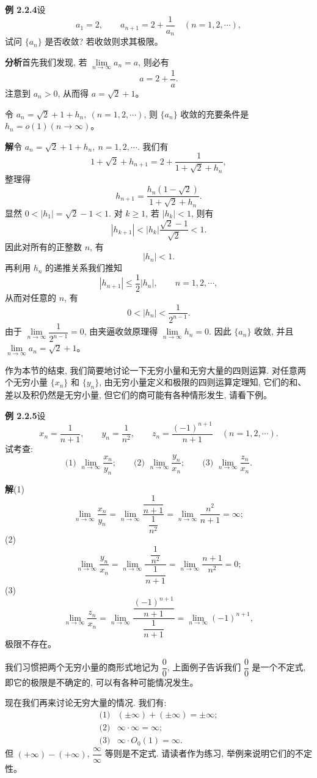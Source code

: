 \documentclass[UTF8, 12pt, fontset=fandol, oneside]{ctexart}
\begin{document}
\noindent\textbf{例 2.2.4}\quad 设
\[
  a_1=2,\qquad a_{n+1}=2+\frac1{a_n}\quad(n=1,2,\cdots),
\]
试问 $\{a_n\}$ 是否收敛? 若收敛则求其极限。

\noindent\textbf{分析}\quad 首先我们发现, 若 $\lim\limits_{n\to\infty}a_n=a$, 则必有
\[
  a=2+\frac1a.
\]
注意到 $a_n>0$, 从而得 $a=\sqrt2+1$。

令 $a_n=\sqrt2+1+h_n,\ (n=1,2,\cdots)$, 则 $\{a_n\}$ 收敛的充要条件是 $h_n=o(1)(n\to\infty)$。

\noindent\textbf{解}\quad 令 $a_n=\sqrt2+1+h_n,\ n=1,2,\cdots$. 我们有
\[
  1+\sqrt2+h_{n+1}=2+\frac1{1+\sqrt2+h_n},
\]
整理得
\[
  h_{n+1}=\frac{h_n(1-\sqrt2)}{1+\sqrt2+h_n}.
\]
显然 $0<|h_1|=\sqrt2-1<1$. 对 $k\geqslant1$, 若 $|h_k|<1$, 则有
\[
  |h_{k+1}|<|h_k|\frac{\sqrt2-1}{\sqrt2}<1.
\]
因此对所有的正整数 $n$, 有
\[
  |h_n|<1.
\]
再利用 $h_n$ 的递推关系我们推知
\[
  |h_{n+1}|\leqslant\frac12|h_n|,\qquad n=1,2,\cdots,
\]
从而对任意的 $n$, 有
\[
  0<|h_n|<\frac1{2^{n-1}}.
\]
由于 $\lim\limits_{n\to\infty}\dfrac1{2^{n-1}}=0$, 由夹逼收敛原理得 $\lim\limits_{n\to\infty}h_n=0$. 因此 $\{a_n\}$ 收敛, 并且 $\lim\limits_{n\to\infty}a_n=\sqrt2+1$。

作为本节的结束, 我们简要地讨论一下无穷小量和无穷大量的四则运算. 对任意两个无穷小量 $\{x_n\}$ 和 $\{y_n\}$, 由无穷小量定义和极限的四则运算定理知, 它们的和、差以及积仍然是无穷小量, 但它们的商可能有各种情形发生, 请看下例。

\noindent\textbf{例 2.2.5}\quad 设
\[
  x_n=\frac1{n+1},\qquad y_n=\frac1{n^2},\qquad z_n=\frac{(-1)^{n+1}}{n+1}\quad(n=1,2,\cdots).
\]
试考查:
\[
  \text{(1) }\lim_{n\to\infty}\frac{x_n}{y_n};\qquad
  \text{(2) }\lim_{n\to\infty}\frac{y_n}{x_n};\qquad
  \text{(3) }\lim_{n\to\infty}\frac{z_n}{x_n}.
\]

\noindent\textbf{解}\quad (1)
\[
  \lim_{n\to\infty}\frac{x_n}{y_n}
  =
  \lim_{n\to\infty}\frac{\dfrac1{n+1}}{\dfrac1{n^2}}
  =
  \lim_{n\to\infty}\frac{n^2}{n+1}
  =
  \infty;
\]
(2)
\[
  \lim_{n\to\infty}\frac{y_n}{x_n}
  =
  \lim_{n\to\infty}\frac{\dfrac1{n^2}}{\dfrac1{n+1}}
  =
  \lim_{n\to\infty}\frac{n+1}{n^2}
  =
  0;
\]
(3)
\[
  \lim_{n\to\infty}\frac{z_n}{x_n}
  =
  \lim_{n\to\infty}\frac{\dfrac{(-1)^{n+1}}{n+1}}{\dfrac1{n+1}}
  =
  \lim_{n\to\infty}(-1)^{n+1},
\]
极限不存在。

我们习惯把两个无穷小量的商形式地记为 $\dfrac00$, 上面例子告诉我们 $\dfrac00$ 是一个不定式, 即它的极限是不确定的, 可以有各种可能情况发生。

现在我们再来讨论无穷大量的情况. 我们有:
\[
\begin{array}{ll}
  \text{(1)} & (\pm\infty)+(\pm\infty)=\pm\infty;\\
  \text{(2)} & \infty\cdot\infty=\infty;\\
  \text{(3)} & \infty\cdot O_0(1)=\infty.
\end{array}
\]
但 $(+\infty)-(+\infty)$, $\dfrac{\infty}{\infty}$ 等则是不定式. 请读者作为练习, 举例来说明它们的不定性。
\end{document}

